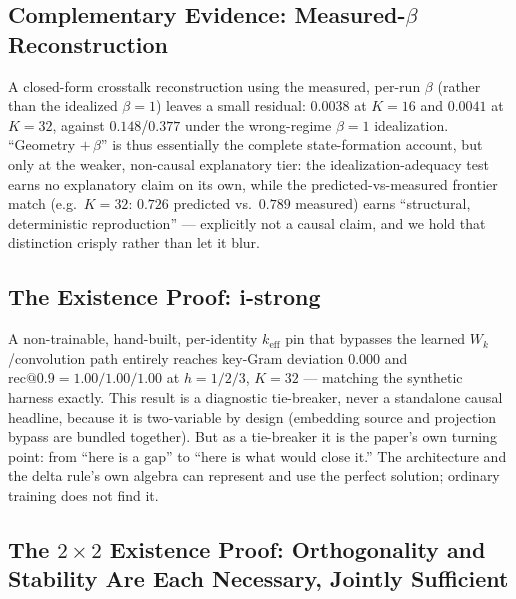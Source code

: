 \subsection{Complementary Evidence: Measured-\texorpdfstring{$\beta$}{beta}
Reconstruction}

A closed-form crosstalk reconstruction using the measured, per-run
$\beta$ (rather than the idealized $\beta{=}1$) leaves a small residual:
$0.0038$ at $K{=}16$ and $0.0041$ at $K{=}32$, against $0.148$/$0.377$
under the wrong-regime $\beta{=}1$ idealization. ``Geometry $+\,\beta$''
is thus essentially the complete state-formation account, but only at the
weaker, non-causal explanatory tier: the idealization-adequacy test earns
no explanatory claim on its own, while the predicted-vs-measured frontier
match (e.g.\ $K{=}32$: $0.726$ predicted vs.\ $0.789$ measured) earns
``structural, deterministic reproduction'' --- explicitly not a causal
claim, and we hold that distinction crisply rather than let it blur.

\subsection{The Existence Proof: i-strong}

A non-trainable, hand-built, per-identity $k_{\mathrm{eff}}$ pin that
bypasses the learned $W_k$/convolution path entirely reaches key-Gram
deviation $0.000$ and $\mathrm{rec@0.9}{=}1.00/1.00/1.00$ at
$h{=}1/2/3$, $K{=}32$ --- matching the synthetic harness exactly. This
result is a diagnostic tie-breaker, never a standalone causal headline,
because it is two-variable by design (embedding source and projection
bypass are bundled together). But as a tie-breaker it is the paper's own
turning point: from ``here is a gap'' to ``here is what would close it.''
The architecture and the delta rule's own algebra can represent and use
the perfect solution; ordinary training does not find it.

\subsection{The \texorpdfstring{$2\times2$}{2x2} Existence Proof:
Orthogonality and Stability Are Each Necessary, Jointly Sufficient}

